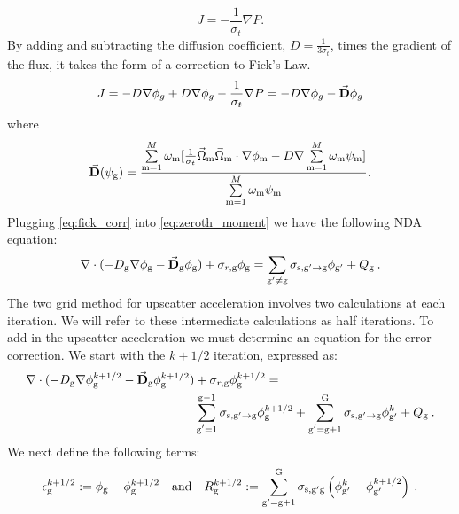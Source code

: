   \begin{equation}
  J= -\frac{1}{\sigma_t} \nabla P. 
  \end{equation}
  By adding and subtracting the diffusion coefficient, $D = \frac{1}{3\sigma_t}$, times the gradient of the flux, it takes the form of a correction to Fick's Law. 
  \begin{equation}
  J = -D \nabla \phi_g + D \nabla \phi_g - \frac{1}{\sigma_t} \nabla P \\
  = -D \nabla \phi_g - \vec{\textbf{D}} \phi_g
  \label{eq:fick_corr}
  \end{equation}
  where 
 \begin{equation}
  \vec{\textbf{D}} (\psi_{\mathrm{g}}) = \frac{\sum\limits_{\mathrm{m}=1}^M \omega_{\mathrm{m}} [\frac{1}{\sigma_t} \vec{\Omega}_{\mathrm{m}} \vec{\Omega}_{\mathrm{m}} \cdot \nabla\phi_{\mathrm{m}} - D \nabla \sum\limits_{\mathrm{m}=1}^M \omega_{\mathrm{m}}\psi_{\mathrm{m}}]}{\sum\limits_{\mathrm{m}=1}^M \omega_{\mathrm{m}} \psi_{\mathrm{m}}}.
  \end{equation} 
 Plugging \ref{eq:fick_corr} into \ref{eq:zeroth_moment} we have the following NDA equation:
  \begin{equation}
  \nabla\cdot(-D_{\mathrm{g}} \nabla \phi_{\mathrm{g}} - \vec{\bf D}_{\mathrm{g}} \phi_{\mathrm{g}}) + \sigma_{r,\mathrm{g}} \phi_{\mathrm{g}} = \sum\limits_{{\mathrm{g}'}\neq\mathrm{g}}\sigma_{\mathrm{s},\mathrm{g}' \rightarrow \mathrm{g}}\phi_{\mathrm{g}'} + Q_{\mathrm{g}} \:. \label{eq:NDA}
  \end{equation}
  The two grid method for upscatter acceleration involves two calculations at each iteration. We will refer to these intermediate calculations as half iterations. To add in the upscatter acceleration we must determine an equation for the error correction. We start with the $k + 1/2$ iteration, expressed as:
  \begin{equation}
  \begin{split}
  \nabla\cdot(-D_{\mathrm{g}} \nabla \phi_{\mathrm{g}}^{k+1/2} - \vec{\bf D}_{\mathrm{g}} \phi_{\mathrm{g}}^{k+1/2}) &+ \sigma_{r,\mathrm{g}} \phi_{\mathrm{g}}^{k+1/2} =  \\ &\sum\limits_{\substack{\mathrm{g}'=1}}^{\mathrm{g-1}} \sigma_{\mathrm{s},\mathrm{g}' \to\mathrm{g}}\phi_{\mathrm{g}}^{k+1/2} + \sum\limits_{\substack{\mathrm{g}'=\mathrm{g}+1}}^{\mathrm{G}} \sigma_{\mathrm{s},\mathrm{g}' \to\mathrm{g}}\phi_{\mathrm{g}'}^{k} + Q_{\mathrm{g}}\:. 
  \end{split}
  \label{eq:k1/2}
  \end{equation}
  We next define the following terms:
  \begin{equation}
  \epsilon_{\mathrm{g}}^{k+1/2} := \phi_{\mathrm{g}} - \phi_{\mathrm{g}}^{k + 1/2} \quad \mathrm{and} \quad R_{\mathrm{g}}^{k+1/2} := \sum\limits_{\mathrm{g}'=\mathrm{g}+1}^{\mathrm{G}} \sigma_{\mathrm{s},\mathrm{g}' \mathrm{g}}\left(\phi_{\mathrm{g}'}^k - \phi_{\mathrm{g}'}^{k + 1/2}\right)\:.
  \end{equation}
